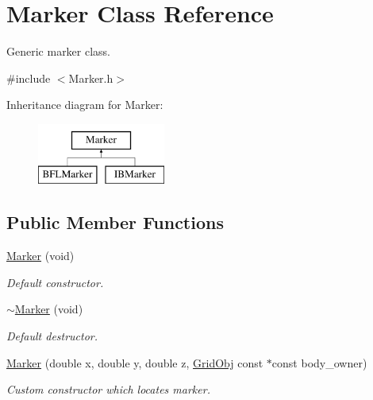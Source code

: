 \hypertarget{class_marker}{}\section{Marker Class Reference}
\label{class_marker}


Generic marker class.  




{\ttfamily \#include $<$Marker.\+h$>$}

Inheritance diagram for Marker\+:\begin{figure}[H]
\begin{center}
\leavevmode
\includegraphics[height=2.000000cm]{class_marker}
\end{center}
\end{figure}
\subsection*{Public Member Functions}
\begin{DoxyCompactItemize}
\item 
\hyperlink{class_marker_ac09c0211aaad490b0dd4ac448c69ba36}{Marker} (void)
\begin{DoxyCompactList}\small\item\em Default constructor. \end{DoxyCompactList}\item 
\hyperlink{class_marker_ac34f00758cfb07bcf550209083633eb6}{$\sim$\+Marker} (void)
\begin{DoxyCompactList}\small\item\em Default destructor. \end{DoxyCompactList}\item 
\hyperlink{class_marker_a39d86412648446a87719fd9a68c4f34b}{Marker} (double x, double y, double z, \hyperlink{class_grid_obj}{Grid\+Obj} const $\ast$const body\+\_\+owner)
\begin{DoxyCompactList}\small\item\em Custom constructor which locates marker. \end{DoxyCompactList}\end{DoxyCompactItemize}
